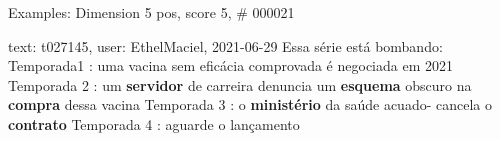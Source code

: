 \begin{frame}{Examples: Dimension 5 pos, score 5, \# 000021}
\footnotesize
\begin{exampleblock}{text: t027145, user: EthelMaciel, 2021-06-29}
Essa série está bombando: Temporada1 : uma vacina sem eficácia comprovada é 
negociada em 2021 Temporada 2 : um \textbf{servidor} de carreira denuncia um 
\textbf{esquema} obscuro na \textbf{compra} dessa vacina Temporada 3 : o 
\textbf{ministério} da saúde acuado- cancela o \textbf{contrato} Temporada 4 : 
aguarde o lançamento  
\end{exampleblock}
\end{frame}
